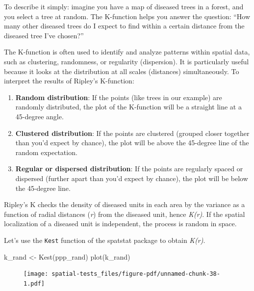\documentclass[
  letterpaper,
]{book}
\newenvironment{Shaded}{\begin{snugshade}}{\end{snugshade}}
\newcommand{\FunctionTok}[1]{\textcolor[rgb]{0.28,0.35,0.67}{#1}}
\newcommand{\NormalTok}[1]{\textcolor[rgb]{0.00,0.23,0.31}{#1}}
\newcommand{\OtherTok}[1]{\textcolor[rgb]{0.00,0.23,0.31}{#1}}
\begin{document}
To describe it simply: imagine you have a map of diseased trees in a
forest, and you select a tree at random. The K-function helps you answer
the question: ``How many other diseased trees do I expect to find within
a certain distance from the diseased tree I've chosen?''

The K-function is often used to identify and analyze patterns within
spatial data, such as clustering, randomness, or regularity
(dispersion). It is particularly useful because it looks at the
distribution at all scales (distances) simultaneously. To interpret the
results of Ripley's K-function:

\begin{enumerate}
\def\labelenumi{\arabic{enumi}.}
\item
  \textbf{Random distribution}: If the points (like trees in our
  example) are randomly distributed, the plot of the K-function will be
  a straight line at a 45-degree angle.
\item
  \textbf{Clustered distribution}: If the points are clustered (grouped
  closer together than you'd expect by chance), the plot will be above
  the 45-degree line of the random expectation.
\item
  \textbf{Regular or dispersed distribution}: If the points are
  regularly spaced or dispersed (further apart than you'd expect by
  chance), the plot will be below the 45-degree line.
\end{enumerate}

Ripley's K checks the density of diseased units in each area by the
variance as a function of radial distances (\emph{r}) from the diseased
unit, hence \emph{K(r)}. If the spatial localization of a diseased unit
is independent, the process is random in space.

Let's use the \texttt{Kest} function of the spatstat package to obtain
\emph{K(r)}.

\begin{Shaded}
\begin{Highlighting}[]
\NormalTok{k\_rand }\OtherTok{\textless{}{-}} \FunctionTok{Kest}\NormalTok{(ppp\_rand)}
\FunctionTok{plot}\NormalTok{(k\_rand)}
\end{Highlighting}
\end{Shaded}

\begin{figure}[H]

\texttt{[image: spatial-tests\_files/figure-pdf/unnamed-chunk-38-1.pdf]} \hfill{}

\end{figure}
\end{document}
